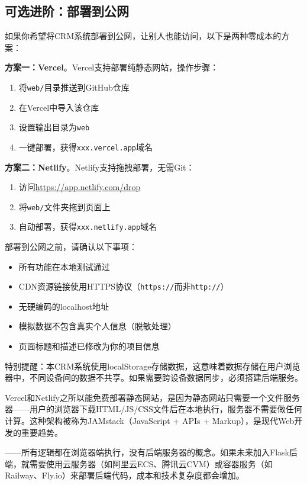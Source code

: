 \subsection{可选进阶：部署到公网}

如果你希望将CRM系统部署到公网，让别人也能访问，以下是两种零成本的方案：

\textbf{方案一：Vercel}。Vercel支持部署纯静态网站，操作步骤：
\begin{enumerate}[leftmargin=2em]
  \item 将\texttt{web/}目录推送到GitHub仓库
  \item 在Vercel中导入该仓库
  \item 设置输出目录为\texttt{web}
  \item 一键部署，获得\texttt{xxx.vercel.app}域名
\end{enumerate}

\textbf{方案二：Netlify}。Netlify支持拖拽部署，无需Git：
\begin{enumerate}[leftmargin=2em]
  \item 访问\url{https://app.netlify.com/drop}
  \item 将\texttt{web/}文件夹拖到页面上
  \item 自动部署，获得\texttt{xxx.netlify.app}域名
\end{enumerate}

\begin{warningbox}[部署前检查清单]
部署到公网之前，请确认以下事项：
\begin{itemize}[leftmargin=2em]
  \item 所有功能在本地测试通过
  \item CDN资源链接使用HTTPS协议（\texttt{https://}而非\texttt{http://}）
  \item 无硬编码的localhost地址
  \item 模拟数据不包含真实个人信息（脱敏处理）
  \item 页面标题和描述已修改为你的项目信息
\end{itemize}
特别提醒：本CRM系统使用localStorage存储数据，这意味着数据存储在用户浏览器中，不同设备间的数据不共享。如果需要跨设备数据同步，必须搭建后端服务。\end{warningbox}

\begin{theorybox}[静态网站部署的技术原理]
Vercel和Netlify之所以能免费部署静态网站，是因为静态网站只需要一个文件服务器——用户的浏览器下载HTML/JS/CSS文件后在本地执行，服务器不需要做任何计算。这种架构被称为JAMstack（JavaScript + APIs + Markup），是现代Web开发的重要趋势。\par\n{}——所有逻辑都在浏览器端执行，没有后端服务器的概念。如果未来加入Flask后端，就需要使用云服务器（如阿里云ECS、腾讯云CVM）或容器服务（如Railway、Fly.io）来部署后端代码，成本和技术复杂度都会增加。\end{theorybox}


